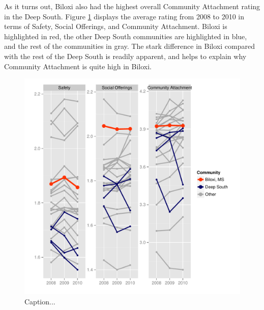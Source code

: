 \documentclass[11pt]{article}\usepackage{knitr}
\begin{document}
As it turns out, Biloxi also had the highest overall Community Attachment rating in the Deep South. Figure \ref{fig:ds_one} displays the average rating from 2008 to 2010 in terms of Safety, Social Offerings, and Community Attachment. Biloxi is highlighted in red, the other Deep South communities are highlighted in blue, and the rest of the communities in gray. The stark difference in Biloxi compared with the rest of the Deep South is readily apparent, and helps to explain why Community Attachment is quite high in Biloxi.

\begin{knitrout}
\color{fgcolor}\begin{figure}[H]

\includegraphics[width=\maxwidth]{figure/ds_one} \caption[Caption]{Caption...\label{fig:ds_one}}
\end{figure}


\end{knitrout}
\end{document}
